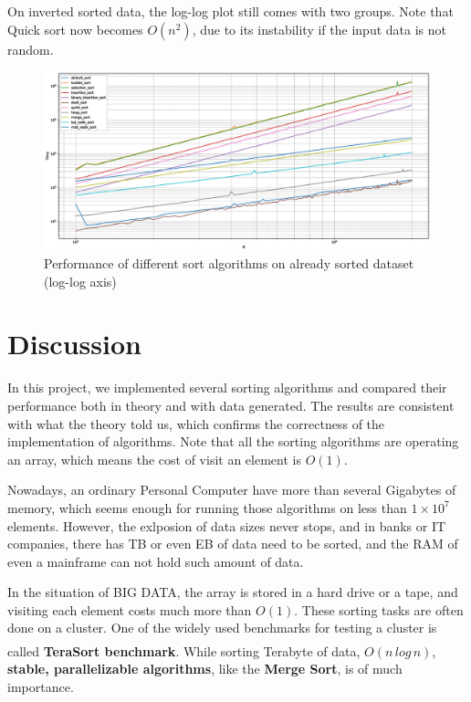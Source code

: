 \documentclass[cn,black,12pt,normal]{elegantnote}
\newcommand{\uct}[1]{\textsuperscript{\textsuperscript{\cite{#1}}}}
\begin{document}
On inverted sorted data, the log-log plot still comes with two groups. Note that Quick sort now becomes $O(n^2)$, due to its instability if the input data is not random.
\begin{figure}[H]
    \centering
    \includegraphics[width=1.0\linewidth]{image/inv.eps}
    \caption{Performance of different sort algorithms on already sorted dataset (log-log axis)}
\end{figure}

\section{Discussion}

In this project, we implemented several sorting algorithms and compared their performance both in theory and with data generated. The results are consistent with what the theory told us, which confirms the correctness of the implementation of algorithms. Note that all the sorting algorithms are operating an array, which means the cost of visit an element is $O(1)$.

Nowadays, an ordinary Personal Computer have more than several Gigabytes of memory, which seems enough for running those algorithms on less than $1\times10^7$ elements. However, the exlposion of data sizes never stops, and in banks or IT companies, there has TB or even EB of data need to be sorted, and the RAM of even a mainframe can not hold such amount of data.

In the situation of BIG DATA, the array is stored in a hard drive or a tape, and visiting each element costs much more than $O(1)$. These sorting tasks are often done on a cluster. One of the widely used benchmarks for testing a cluster is called \textbf{TeraSort benchmark}.\uct{o2008terabyte} While sorting Terabyte of data, $O(n\,log\,n)$, \textbf{stable, parallelizable algorithms}, like the \textbf{Merge Sort}, is of much importance. 

\newpage

\end{document}
